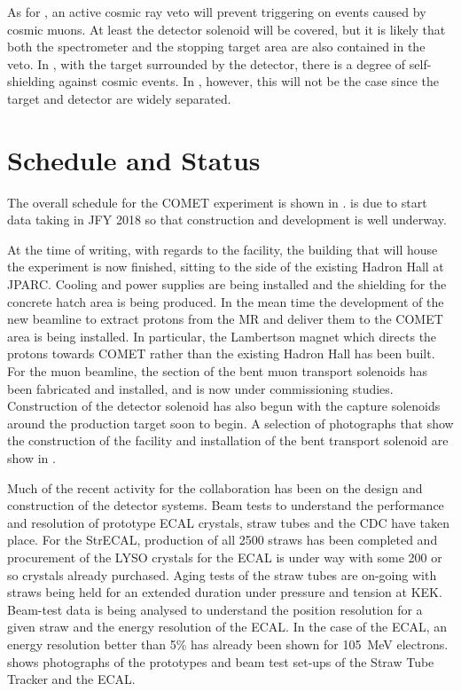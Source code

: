 As for \phaseI, an active cosmic ray veto will prevent triggering on events caused by cosmic muons.
At least the detector solenoid will be covered, but it is likely that both the spectrometer and the stopping target area are also contained in the veto.
In \phaseI, with the target surrounded by the detector, there is a degree of self-shielding against cosmic events. 
In \phaseII, however, this will not be the case since the target and detector are widely separated.


\section{Schedule and Status}
\FigSchedule
The overall schedule for the COMET experiment is shown in .
\phaseI is due to start data taking in \ac{JFY} 2018 so that construction and development is well underway.

\FigStatusFacility
At the time of writing, with regards to the facility, the building that will house the experiment is now finished, sitting to the side of the existing Hadron Hall at \ac{JPARC}.
Cooling and power supplies are being installed and the shielding for the concrete hatch area is being produced.
In the mean time the development of the new beamline to extract protons from the \ac{MR} and deliver them to the COMET area is being installed.
In particular, the Lambertson magnet which directs the protons towards COMET rather than the existing Hadron Hall has been built.
For the muon beamline, the \phaseI section of the bent muon transport solenoids has been fabricated and installed, and is now under commissioning studies.
Construction of the detector solenoid has also begun with the capture solenoids around the production target soon to begin.
A selection of photographs that show the construction of the facility and installation of the bent transport solenoid are show in .

\FigStatusStrECAL
Much of the recent activity for the collaboration has been on the design and construction of the detector systems.
Beam tests to understand the performance and resolution of prototype ECAL crystals, straw tubes and the \ac{CDC} have taken place.
For the \ac{StrECAL}, production of all 2500 \phaseI straws has been completed and procurement of the \ac{LYSO} crystals for the ECAL is under way with some 200 or so crystals already purchased.
Aging tests of the straw tubes are on-going with straws being held for an extended duration under pressure and tension at KEK.
Beam-test data is being analysed to understand the position resolution for a given straw and the energy resolution of the ECAL.
In the case of the ECAL, an energy resolution better than 5\% has already been shown for 105~MeV electrons.
 shows photographs of the prototypes and beam test set-ups of the Straw Tube Tracker and the ECAL.


